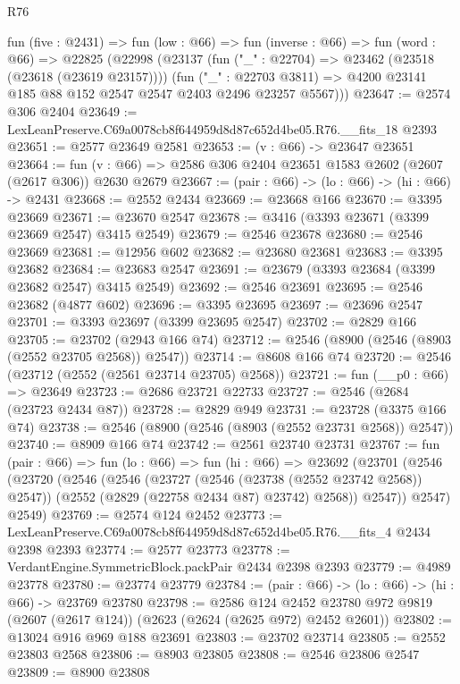 \begin{lexlean}{R76}
\begin{coremodule}
  fun (five : @2431) =>
  fun (low : @66) =>
  fun (inverse : @66) =>
  fun (word : @66) =>
  @22825
    (@22998
      (@23137
        (fun ("_" : @22704) => @23462 (@23518 (@23618 (@23619 @23157))))
        (fun ("_" : @22703 @3811) =>
        @4200 @23141 @185 @88 @152 @2547 @2547 @2403 @2496 @23257 @5567)))
@23647 := @2574 @306 @2404
@23649 := LexLeanPreserve.C69a0078cb8f644959d8d87c652d4be05.R76.__fits_18 @2393
@23651 := @2577 @23649 @2581
@23653 := (v : @66) -> @23647 @23651
@23664 := fun (v : @66) => @2586 @306 @2404 @23651 @1583 @2602 (@2607 (@2617 @306)) @2630 @2679
@23667 := (pair : @66) -> (lo : @66) -> (hi : @66) -> @2431
@23668 := @2552 @2434
@23669 := @23668 @166
@23670 := @3395 @23669
@23671 := @23670 @2547
@23678 := @3416 (@3393 @23671 (@3399 @23669 @2547) @3415 @2549)
@23679 := @2546 @23678
@23680 := @2546 @23669
@23681 := @12956 @602
@23682 := @23680 @23681
@23683 := @3395 @23682
@23684 := @23683 @2547
@23691 := @23679 (@3393 @23684 (@3399 @23682 @2547) @3415 @2549)
@23692 := @2546 @23691
@23695 := @2546 @23682 (@4877 @602)
@23696 := @3395 @23695
@23697 := @23696 @2547
@23701 := @3393 @23697 (@3399 @23695 @2547)
@23702 := @2829 @166
@23705 := @23702 (@2943 @166 @74)
@23712 := @2546 (@8900 (@2546 (@8903 (@2552 @23705 @2568)) @2547))
@23714 := @8608 @166 @74
@23720 := @2546 (@23712 (@2552 (@2561 @23714 @23705) @2568))
@23721 := fun (__p0 : @66) => @23649
@23723 := @2686 @23721 @22733
@23727 := @2546 (@2684 (@23723 @2434 @87))
@23728 := @2829 @949
@23731 := @23728 (@3375 @166 @74)
@23738 := @2546 (@8900 (@2546 (@8903 (@2552 @23731 @2568)) @2547))
@23740 := @8909 @166 @74
@23742 := @2561 @23740 @23731
@23767 := fun (pair : @66) =>
  fun (lo : @66) =>
  fun (hi : @66) =>
  @23692
    (@23701
      (@2546
        (@23720
          (@2546
            (@2546
              (@23727 (@2546 (@23738 (@2552 @23742 @2568)) @2547))
              (@2552 (@2829 (@22758 @2434 @87) @23742) @2568))
            @2547))
        @2547)
      @2549)
@23769 := @2574 @124 @2452
@23773 := LexLeanPreserve.C69a0078cb8f644959d8d87c652d4be05.R76.__fits_4 @2434 @2398 @2393
@23774 := @2577 @23773
@23778 := VerdantEngine.SymmetricBlock.packPair @2434 @2398 @2393
@23779 := @4989 @23778
@23780 := @23774 @23779
@23784 := (pair : @66) -> (lo : @66) -> (hi : @66) -> @23769 @23780
@23798 := @2586
    @124
    @2452
    @23780
    @972
    @9819
    (@2607 (@2617 @124))
    (@2623 (@2624 (@2625 @972) @2452 @2601))
@23802 := @13024 @916 @969 @188 @23691
@23803 := @23702 @23714
@23805 := @2552 @23803 @2568
@23806 := @8903 @23805
@23808 := @2546 @23806 @2547
@23809 := @8900 @23808

\end{coremodule}
\end{lexlean}
